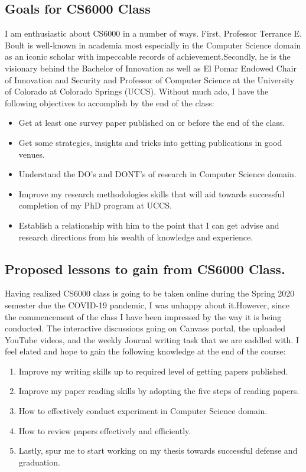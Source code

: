 \subsection{Goals for CS6000 Class}
I am enthusiastic about CS6000 in a number of ways. First, Professor Terrance E. Boult is well-known in academia most especially in the Computer Science domain as an iconic scholar with impeccable records of achievement.Secondly, he is the visionary behind the Bachelor of Innovation as well as El Pomar Endowed Chair of Innovation and Security and Professor of Computer Science at the University of Colorado at Colorado Springs (UCCS). Without much ado, I have the following objectives to accomplish by the end of the class:
\begin{itemize}
    \item Get at least one survey paper published on or before the end of the class.
    \item Get some strategies, insights and tricks into getting publications in good venues.
    \item Understand the DO's and DONT's of research in Computer Science domain.
    \item Improve my research methodologies skills that will aid towards successful completion of my PhD program at UCCS.
    \item Establish a relationship with him to the point that I can get advise and research directions from his wealth of knowledge and experience.
\end{itemize}

\subsection{Proposed lessons to gain from CS6000 Class.}
Having realized CS6000 class is going to be taken online during the Spring 2020 semester due the COVID-19 pandemic, I was unhappy about it.However, since the commencement of the class I have been impressed by the way it is being conducted. The interactive discussions going on Canvass portal, the uploaded YouTube videos, and the weekly Journal writing task that we are saddled with. I feel elated and hope to gain the following knowledge at the end of the course:
\begin{enumerate}
    \item Improve my writing skills up to required level of getting papers published.
    \item Improve my paper reading skills by adopting the five steps of reading papers.
    \item How to effectively conduct experiment in Computer Science domain. 
    \item How to review papers effectively and efficiently.
    \item Lastly, spur me to start working on my thesis towards successful defense and graduation.
\end{enumerate}

